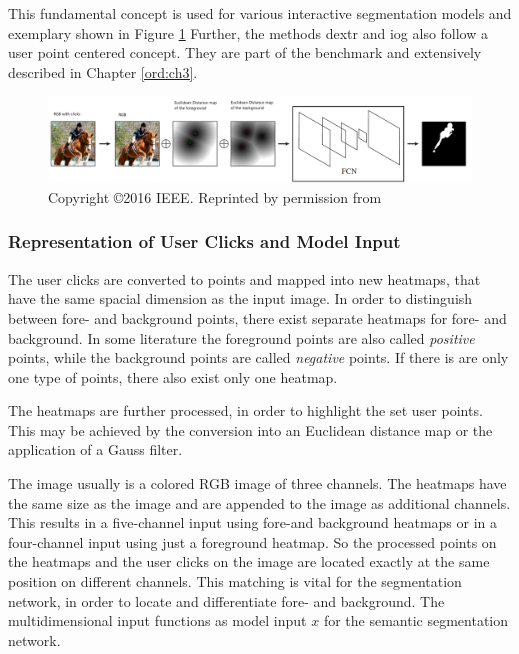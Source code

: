 This fundamental concept is used for various interactive segmentation models \cite{Xu16-InteractiveObjectSelection} \cite{MVL18-ITIS} and exemplary shown in Figure \ref{fig:ch2:sec3:ifcn}
Further, the methods \gls{dextr}  \cite{Man18-DEXTR} and \gls{iog} \cite{Zha20-IOG} also follow a user point centered concept. They are part of the benchmark and extensively described in Chapter \ref{ord:ch3}.
\begin{figure}
	\includegraphics[width=\linewidth]{figures/chap232_ifcn.png}
	\caption[Interactively Fully Convolutional Network]{Copyright \copyright 2016 IEEE. Reprinted by permission from \cite{Xu16-InteractiveObjectSelection}}
	\label{fig:ch2:sec3:ifcn}
\end{figure}

\subsubsection{Representation of User Clicks and Model Input}
The user clicks are converted to points and mapped into new heatmaps, that have the same spacial dimension as the input image.
In order to distinguish between fore- and background points, there exist separate heatmaps for fore- and background.
In some literature the foreground points are also called \textit{positive} points, while the background points are called \textit{negative} points.
If there is are only one type of points, there also exist only one heatmap.

The heatmaps are further processed, in order to highlight the set user points.
This may be achieved by the conversion into an Euclidean distance map \cite{Dan80-EuclideanDistanceMapping} or the application of a Gauss filter.

The image usually is a colored RGB image of three channels.
The heatmaps have the same size as the image and are appended to the image as additional channels.
This results in a five-channel input using fore-and background heatmaps or in a four-channel input using just a foreground heatmap.
So the processed points on the heatmaps and the user clicks on the image are located exactly at the same position on different channels.
This matching is vital for the segmentation network, in order to locate and differentiate fore- and background.
The multidimensional input functions as model input $x$ for the semantic segmentation network.

